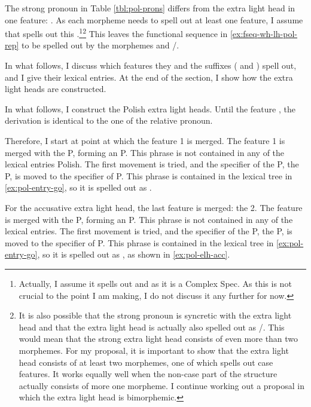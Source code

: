 The strong pronoun in Table \ref{tbl:pol-prons} differs from the extra light head in one feature: . As each morpheme needs to spell out at least one feature, I assume that  spells out this .\footnote{
Actually, I assume it spells out  and  as it is a Complex Spec. As this is not crucial to the point I am making, I do not discuss it any further for now.
}\footnote{
It is also possible that the strong pronoun is syncretic with the extra light head and that the extra light head is actually also spelled out as /. This would mean that the strong extra light head consists of even more than two morphemes. For my proposal, it is important to show that the extra light head consists of at least two morphemes, one of which spells out case features. It works equally well when the non-case part of the structure actually consists of more one morpheme. I continue working out a proposal in which the extra light head is bimorphemic.
}
This leaves the functional sequence in \ref{ex:fseq-wh-lh-pol-rep} to be spelled out by the morphemes  and /.

In what follows, I discuss which features they  and the suffixes ( and ) spell out, and I give their lexical entries. At the end of the section, I show how the extra light heads are constructed.


In what follows, I construct the Polish extra light heads. Until the feature , the derivation is identical to the one of the relative pronoun.


Therefore, I start at point at which the feature 1 is merged. The feature 1 is merged with the P, forming an P. This phrase is not contained in any of the lexical entries Polish. The first movement is tried, and the specifier of the P, the P, is moved to the specifier of P. This phrase is contained in the lexical tree in \ref{ex:pol-entry-go}, so it is spelled out as .

For the accusative extra light head, the last feature is merged: the 2.
The feature is merged with the P, forming an P. This phrase is not contained in any of the lexical entries. The first movement is tried, and the specifier of the P, the P, is moved to the specifier of P. This phrase is contained in the lexical tree in \ref{ex:pol-entry-go}, so it is spelled out as , as shown in \ref{ex:pol-elh-acc}.

